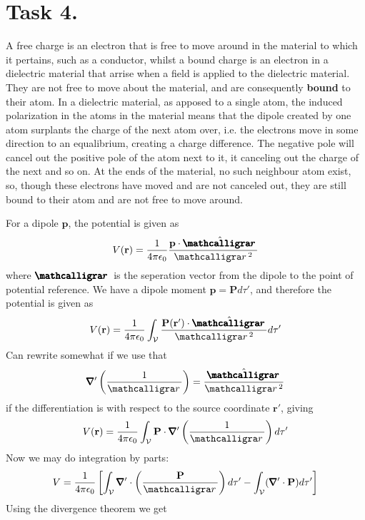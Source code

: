 \documentclass[a4paper,11pt]{article}
\begin{document}
\section*{Task 4.}
\begin{alphalist}
    \item A free charge is an electron that is free to move around in the material to which it pertains, such as a conductor, whilst a bound charge is an electron 
        in a dielectric material that arrise when a field is applied to the dielectric material. They are not free to move about the material, and are consequently \textbf{bound} 
        to their atom. In a dielectric material, as apposed to a single atom, the induced polarization in the atoms in the material means that the dipole created by one 
        atom surplants the charge of the next atom over, i.e. the electrons move in some direction to an equalibrium, creating a charge difference. The negative pole will cancel out the 
        positive pole of the atom next to it, it canceling out the charge of the next and so on. At the ends of the material, no such neighbour atom exist, so, though these electrons have moved and are not 
        canceled out, they are still bound to their atom and are not free to move around.
    \item For a dipole $\mathbf{p}$, the potential is given as
        \[
            V(\mathbf{r}) = \frac{1}{4\pi\epsilon_0}\frac{\mathbf{p} \cdot \hat{\boldscriptr}}{\scriptr^2}
        \]
        where $\boldscriptr$ is the seperation vector from the dipole to the point of potential reference. We have a dipole moment $\mathbf{p} = \mathbf{P} d\tau '$,
        and therefore the potential is given as 
        \[
            V(\mathbf{r}) = \frac{1}{4\pi\epsilon_0}\int_{\mathcal{V}} \frac{\mathbf{P}(\mathbf{r}') \cdot \hat{\boldscriptr}}{\scriptr^2} d\tau' 
        \]
        Can rewrite somewhat if we use that
        \[
            \pmb{\nabla}' \left(\frac{1}{\scriptr}\right) = \frac{\hat{\boldscriptr}}{\scriptr^2}
        \]
        if the differentiation is with respect to the source coordinate $\mathbf{r}'$, giving
        \[
            V(\mathbf{r}) = \frac{1}{4\pi\epsilon_0}\int_{\mathcal{V}} \mathbf{P} \cdot \pmb{\nabla}' \left(\frac{1}{\scriptr}\right) d\tau' 
        \]
        Now we may do integration by parts:
        \[
            V = \frac{1}{4\pi\epsilon_0}\left[\int_{\mathcal{V}} \pmb{\nabla}' \cdot \left(\frac{\mathbf{P}}{\scriptr}\right) d\tau' - \int_{\mathcal{V}}(\pmb{\nabla}' \cdot \mathbf{P}) d\tau'\right]
        \]
        Using the divergence theorem we get

\end{alphalist}
\end{document}

